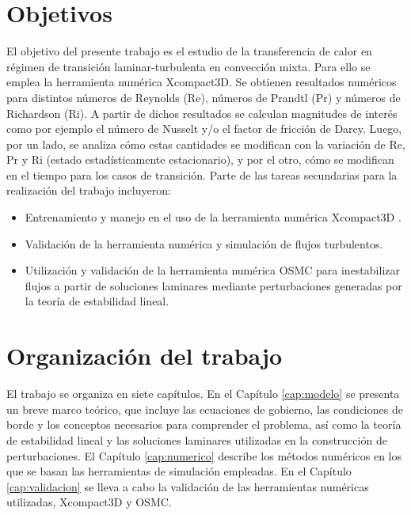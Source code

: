 \section{Objetivos}

El objetivo del presente trabajo es el estudio de la transferencia de calor en \linebreak régimen de transición laminar-turbulenta en convección mixta. Para ello se emplea la herramienta numérica Xcompact3D. Se obtienen resultados numéricos para distintos números de Reynolds (Re), números de Prandtl (Pr) y números de Richardson (Ri). A partir de dichos resultados se calculan magnitudes de interés como por ejemplo el número de Nusselt y/o el factor de fricción de Darcy. Luego, por un lado, se analiza cómo estas cantidades se modifican  con la variación de Re, Pr y Ri (estado estadísticamente estacionario), y por el otro, cómo se modifican en el tiempo para los casos de transición. Parte de las tareas secundarias para la realización del trabajo incluyeron:

\begin{itemize}

	\item Entrenamiento y manejo en el uso de la herramienta numérica Xcompact3D \linebreak \cite{bartholomew2020xcompact3d}.
	
	\item Validación de la herramienta numérica y simulación de flujos turbulentos.

	\item Utilización y validación de la herramienta numérica OSMC \cite{szuban2023} para inestabilizar flujos a partir de soluciones laminares mediante perturbaciones \linebreak generadas por la teoría de estabilidad lineal.

\end{itemize}

\section{Organización del trabajo}

El trabajo se organiza en siete capítulos. En el Capítulo \ref{cap:modelo} se presenta un breve marco teórico, que incluye las ecuaciones de gobierno, las condiciones de borde y los conceptos necesarios para comprender el problema, así como la teoría de estabilidad lineal y las soluciones laminares utilizadas en la construcción de perturbaciones. El Capítulo \ref{cap:numerico} describe los métodos numéricos en los que se basan las herramientas de simulación empleadas. En el Capítulo \ref{cap:validacion} se lleva a cabo la validación de las herramientas numéricas utilizadas, Xcompact3D y OSMC.

